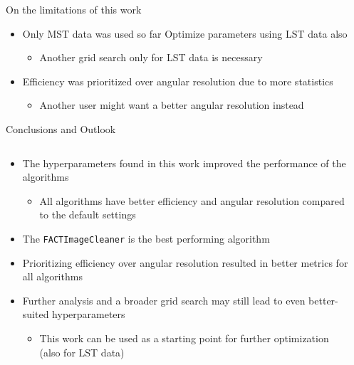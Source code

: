 \begin{frame}{On the limitations of this work}
    \begin{itemize}
        \item Only MST data was used so far \rightarrow{} Optimize parameters using LST data also
        \begin{itemize}
            \item [\rightarrow] Another grid search only for LST data is necessary
        \end{itemize}
        \setlength\itemsep{1em}
        \item Efficiency was prioritized over angular resolution due to more statistics
        \begin{itemize}
            \item [\rightarrow] Another user might want a better angular resolution instead
        \end{itemize}
    \end{itemize}
\end{frame}

\begin{frame}{Conclusions and Outlook}
    \begin{columns}
        \begin{column}{0.48\textwidth}
            \begin{itemize}
                \item The hyperparameters found in this work improved the performance of the algorithms
                \begin{itemize}
                    \item [\rightarrow] All algorithms have better efficiency and angular resolution compared to the default settings
                \end{itemize}
                \item The \texttt{FACTImageCleaner} is the best performing algorithm
                \item Prioritizing efficiency over angular resolution resulted in better metrics for all algorithms
                \item [\rightarrow] Further analysis and a broader grid search may still lead to even better-suited hyperparameters
                \begin{itemize}
                    \item [\rightarrow] This work can be used as a starting point for further optimization (also for LST data)
                \end{itemize}
            \end{itemize}
        \end{column}
        \begin{column}{0.48\textwidth}

        \end{column}
    \end{columns}
\end{frame}